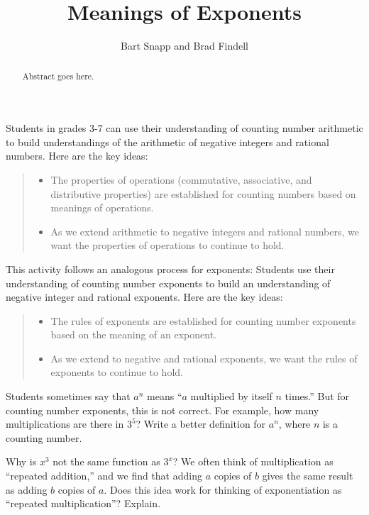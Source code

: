 \documentclass{ximera}
\title{Meanings of Exponents}
\author{Bart Snapp and Brad Findell}
\begin{document}
\begin{abstract}
Abstract goes here.  
\end{abstract}
\maketitle

\label{A:MeaningsOfExponents}

Students in grades 3-7 can use their understanding of counting number arithmetic to build understandings of the arithmetic of negative integers and rational numbers.  Here are the key ideas: 
\begin{quote}
\begin{itemize}
\item The properties of operations (commutative, associative, and distributive properties) are established for counting numbers based on meanings of operations. 
\item As we extend arithmetic to negative integers and rational numbers, we want the properties of operations to continue to hold.  
\end{itemize}
\end{quote}

This activity follows an analogous process for exponents: Students use their understanding of counting number exponents to build an understanding of negative integer and rational exponents.  Here are the key ideas: 
\begin{quote}
\begin{itemize}
\item The rules of exponents are established for counting number exponents based on the meaning of an exponent.  
\item As we extend to negative and rational exponents, we want the rules of exponents to continue to hold.  
\end{itemize}
\end{quote}

\begin{problem}
Students sometimes say that $a^n$ means ``$a$ multiplied by itself $n$ times.''  But for counting number exponents, this is not correct.  For example, how many multiplications are there in $3^5$?  Write a better definition for $a^n$, where $n$ is a counting number.  
\end{problem}

\begin{problem}
Why is $x^3$ not the same function as $3^x$?  We often think of multiplication as ``repeated addition,'' and we find that adding $a$ copies of $b$ gives the same result as adding $b$ copies of $a$.  Does this idea work for thinking of exponentiation as ``repeated multiplication''?  Explain.  
\end{problem}
\end{document}
